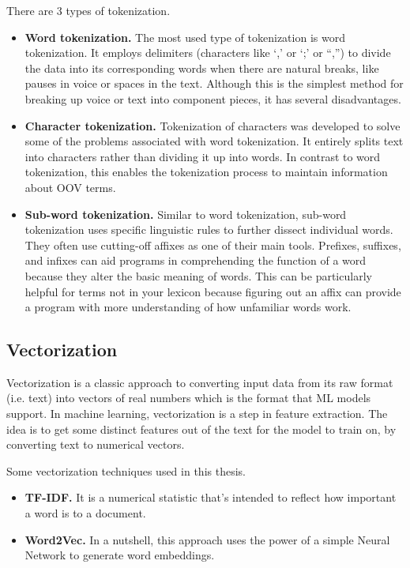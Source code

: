 There are 3 types of tokenization.
\begin{itemize}
	\item \textbf{Word tokenization.} The most used type of tokenization is word tokenization. It employs delimiters (characters like `,' or `;' or ``,'') to divide the data into its corresponding words when there are natural breaks, like pauses in voice or spaces in the text. Although this is the simplest method for breaking up voice or text into component pieces, it has several disadvantages.  
	\item \textbf{Character tokenization.} Tokenization of characters was developed to solve some of the problems associated with word tokenization. It entirely splits text into characters rather than dividing it up into words. In contrast to word tokenization, this enables the tokenization process to maintain information about OOV terms.
	\item \textbf{Sub-word tokenization.} Similar to word tokenization, sub-word tokenization uses specific linguistic rules to further dissect individual words. They often use cutting-off affixes as one of their main tools. Prefixes, suffixes, and infixes can aid programs in comprehending the function of a word because they alter the basic meaning of words. This can be particularly helpful for terms not in your lexicon because figuring out an affix can provide a program with more understanding of how unfamiliar words work.  
\end{itemize}

\subsection{Vectorization}
\hspace{0.5cm}Vectorization is a classic approach to converting input data from its raw format (i.e. text) into vectors of real numbers which is the format that ML models support. 
In machine learning, vectorization is a step in feature extraction. The idea is to get some distinct features out of the text for the model to train on, by converting text to numerical vectors.

Some vectorization techniques used in this thesis.
\begin{itemize}
	\item \textbf{TF-IDF.} It is a numerical statistic that's intended to reflect how important a word is to a document.
	\item \textbf{Word2Vec.} In a nutshell, this approach uses the power of a simple Neural Network to generate word embeddings. 
\end{itemize}



